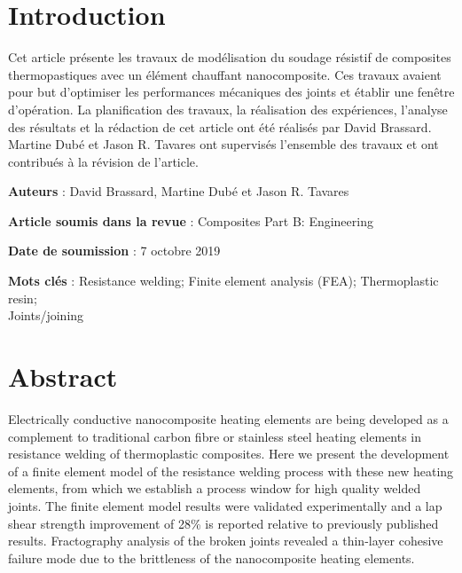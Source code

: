\label{sec:Theme2}

\section{Introduction}

Cet article présente les travaux de modélisation du soudage résistif de composites thermopastiques avec un élément chauffant nanocomposite. Ces travaux avaient pour but d'optimiser les performances mécaniques des joints et établir une fenêtre d'opération. La planification des travaux, la réalisation des expériences, l'analyse des résultats et la rédaction de cet article ont été réalisés par David Brassard. Martine Dubé et Jason R. Tavares ont supervisés l'ensemble des travaux et ont contribués à la révision de l'article. 

\textbf{Auteurs} : David Brassard, Martine Dubé et Jason R. Tavares

\textbf{Article soumis dans la revue} : Composites Part B: Engineering

\textbf{Date de soumission} : 7 octobre 2019

\textbf{Mots clés} : Resistance welding; Finite element analysis (FEA); Thermoplastic resin; \\ Joints/joining


\section{Abstract}

Electrically conductive nanocomposite heating elements are being developed as a complement to traditional carbon fibre or stainless steel heating elements in resistance welding of thermoplastic composites. 
Here we present the development of a finite element model of the resistance welding process with these new heating elements, from which we establish a process window for high quality welded joints. 
The finite element model results were validated experimentally and a lap shear strength improvement of 28\% is reported relative to previously published results. 
Fractography analysis of the broken joints revealed a thin-layer cohesive failure mode due to the brittleness of the nanocomposite heating elements. 

